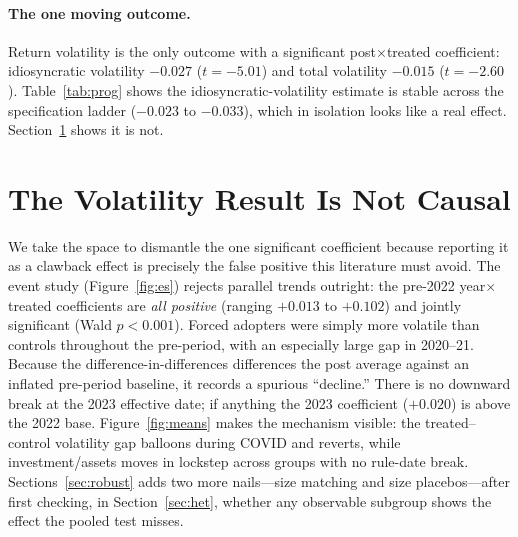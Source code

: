 \documentclass[12pt]{article}
\begin{document}
\paragraph{The one moving outcome.} Return volatility is the only outcome with a significant
post$\times$treated coefficient: idiosyncratic volatility $-0.027$ ($t=-5.01$) and total
volatility $-0.015$ ($t=-2.60$). Table~\ref{tab:prog} shows the idiosyncratic-volatility
estimate is stable across the specification ladder ($-0.023$ to $-0.033$), which in isolation
looks like a real effect. Section~\ref{sec:noncausal} shows it is not.

\section{The Volatility Result Is Not Causal}\label{sec:noncausal}
We take the space to dismantle the one significant coefficient because reporting it as a
clawback effect is precisely the false positive this literature must avoid. The event study
(Figure~\ref{fig:es}) rejects parallel trends outright: the pre-2022 year$\times$treated
coefficients are \emph{all positive} (ranging $+0.013$ to $+0.102$) and jointly significant
(Wald $p<0.001$). Forced adopters were simply more volatile than controls throughout the
pre-period, with an especially large gap in 2020--21. Because the difference-in-differences
differences the post average against an inflated pre-period baseline, it records a spurious
``decline.'' There is no downward break at the 2023 effective date; if anything the 2023
coefficient ($+0.020$) is above the 2022 base. Figure~\ref{fig:means} makes the mechanism
visible: the treated--control volatility gap balloons during COVID and reverts, while
investment/assets moves in lockstep across groups with no rule-date break. Sections~\ref{sec:robust}
adds two more nails---size matching and size placebos---after first checking, in
Section~\ref{sec:het}, whether any observable subgroup shows the effect the pooled test misses.
\end{document}
